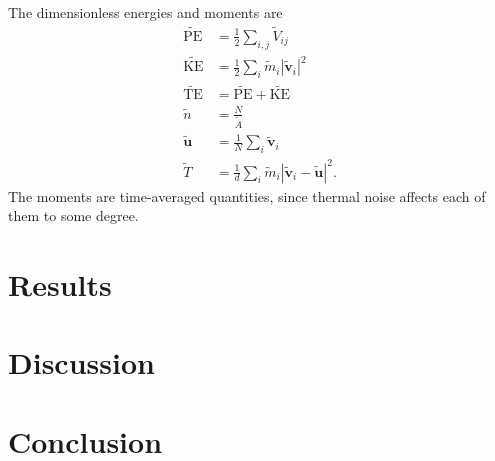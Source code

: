 \documentclass{article}
\begin{document}
The dimensionless energies and moments are
\begin{align*}
\tilde{\text{PE}} 	&= \frac{1}{2}\sum_{i,j}\tilde{V}_{ij} \\
\tilde{\text{KE}} 	&= \frac{1}{2}\sum_{i}\tilde{m}_i|\tilde{\mathbf{v}}_i|^2 \\
\tilde{\text{TE}} 	&= \tilde{\text{PE}} + \tilde{\text{KE}} \\
\tilde{n}			&= \frac{N}{\tilde{A}} \\
\tilde{\mathbf{u}}			&= \frac{1}{N}\sum_{i}\tilde{\mathbf{v}}_i \\
\tilde{T}			&= \frac{1}{d}\sum_{i}\tilde{m}_i\left|\tilde{\mathbf{v}}_i-\tilde{\mathbf{u}}\right|^2.
\end{align*}
The moments are time-averaged quantities, since thermal noise affects each of them to some degree.


\section{Results}

\section{Discussion}

\section{Conclusion}

\newpage


\end{document}
